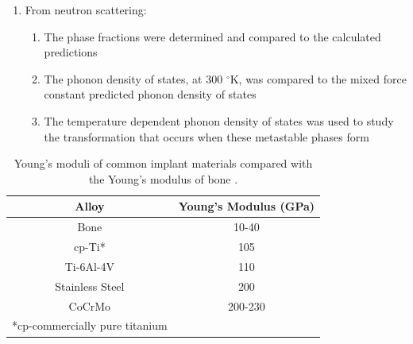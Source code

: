 \begin{enumerate}
\begin{enumerate}
\begin{enumerate}
		\end{enumerate}
		\item From neutron scattering:
		\begin{enumerate}
			\item The phase fractions were determined and compared to the calculated predictions
			\item The phonon density of states, at 300 $^\circ$K, was compared to the mixed force constant predicted phonon density of states 
			\item The temperature dependent phonon density of states was used to study the transformation that occurs when these metastable phases form
		\end{enumerate}
	\end{enumerate} 
\end{enumerate}
				
\pagebreak
\begin{table}[H]
	\caption{Young's moduli of common implant materials compared with the Young's modulus of bone \cite{Long1998a}.}
	\centering
	\begin{tabular}{ c c }
		\hline
		Alloy & Young's Modulus (GPa) \\
		\hline
		Bone & 10-40\\
		cp-Ti* & 105\\
		Ti-6Al-4V & 110\\
		Stainless Steel & 200\\
		CoCrMo & 200-230\\
		\hline
		*cp-commercially pure titanium 
	\end{tabular}
\label{table:commonEM}
\end{table}
\clearpage

